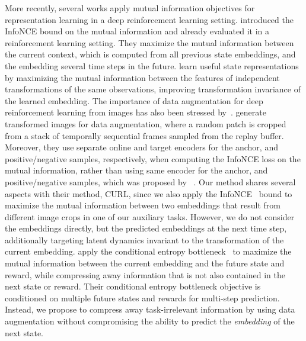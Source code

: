 \documentclass[a4paper,12pt]{article}
\begin{document}
More recently, several works apply mutual information objectives for representation learning in a deep reinforcement learning setting.
\citet{oord2018} introduced the InfoNCE bound on the mutual information and already evaluated it in a reinforcement learning setting. They maximize the mutual information between the current context, which is computed from all previous state embeddings, and the embedding several time steps in the future.  
\citet{laskin2020curl} learn useful state representations by maximizing the mutual information between the features of independent transformations of the same observations, improving transformation invariance of the learned embedding. The importance of data augmentation for deep reinforcement learning from images has also been stressed by~\citet{yarats2021image}.  \citet{laskin2020curl} generate transformed images for data augmentation, where a random patch is cropped from a stack of temporally sequential frames sampled from the replay buffer. Moreover, they use separate online and target encoders for the anchor, and positive/negative samples, respectively, when computing the InfoNCE loss on the mutual information, rather than using same encoder for the anchor, and positive/negative samples, which was  proposed by ~\citet{oord2018}. Our method shares several aspects with their method, CURL, since we also apply the InfoNCE~\cite{oord2018} bound to maximize the mutual information between two embeddings that result from different image crops in one of our auxiliary tasks. However, we do not consider the embeddings directly, but the predicted embeddings at the next time step, additionally targeting latent dynamics invariant to the transformation of the current embedding.
\citet{lee2020predictive} apply the conditional entropy bottleneck~\cite{Fischer2020conditional} to maximize the mutual information between the current embedding and the future state and reward, while compressing away information that is not also contained in the next state or reward. Their conditional entropy bottleneck objective is conditioned on multiple future states and rewards for multi-step prediction. Instead, we propose to compress away task-irrelevant information by using data augmentation without compromising the ability to predict the \emph{embedding} of the next state.
\end{document}
